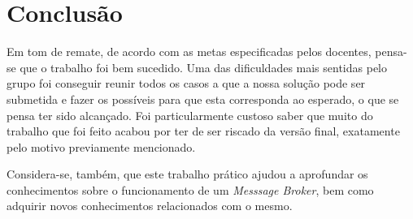 \documentclass[10pt,portuguese]{article}
\begin{document}
\section{Conclusão}
\par Em tom de remate, de acordo com as metas especificadas pelos docentes, pensa-se que o trabalho foi bem sucedido. Uma das dificuldades mais sentidas pelo grupo foi conseguir reunir todos os casos a que a nossa solução pode ser submetida e fazer os possíveis para que esta corresponda ao esperado, o que se pensa ter sido alcançado. Foi particularmente custoso saber que muito do trabalho que foi feito acabou por ter de ser riscado da versão final, exatamente pelo motivo previamente mencionado.
\par Considera-se, também, que este trabalho prático ajudou a aprofundar os conhecimentos sobre o funcionamento de um \textit{Messsage Broker}, bem como adquirir novos conhecimentos relacionados com o mesmo.
    
\end{document}
